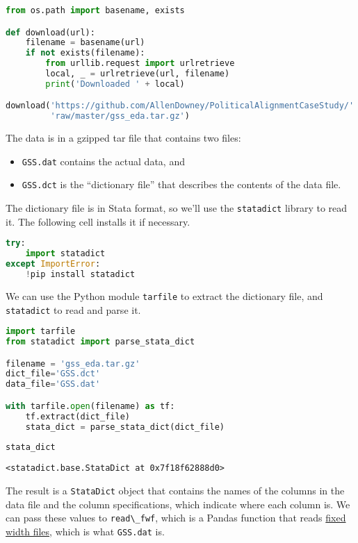 \begin{lstlisting}[language=Python]
from os.path import basename, exists

def download(url):
    filename = basename(url)
    if not exists(filename):
        from urllib.request import urlretrieve
        local, _ = urlretrieve(url, filename)
        print('Downloaded ' + local)

download('https://github.com/AllenDowney/PoliticalAlignmentCaseStudy/' +
         'raw/master/gss_eda.tar.gz')
\end{lstlisting}

The data is in a gzipped tar file that contains two files:

\begin{itemize}
\item
  \passthrough{\lstinline!GSS.dat!} contains the actual data, and
\item
  \passthrough{\lstinline!GSS.dct!} is the ``dictionary file'' that
  describes the contents of the data file.
\end{itemize}

The dictionary file is in Stata format, so we'll use the
\passthrough{\lstinline!statadict!} library to read it. The following
cell installs it if necessary.

\begin{lstlisting}[language=Python]
try:
    import statadict
except ImportError:
    !pip install statadict
\end{lstlisting}

We can use the Python module \passthrough{\lstinline!tarfile!} to
extract the dictionary file, and \passthrough{\lstinline!statadict!} to
read and parse it.

\begin{lstlisting}[language=Python]
import tarfile
from statadict import parse_stata_dict

filename = 'gss_eda.tar.gz'
dict_file='GSS.dct'
data_file='GSS.dat'

with tarfile.open(filename) as tf:
    tf.extract(dict_file)
    stata_dict = parse_stata_dict(dict_file)
        
stata_dict
\end{lstlisting}

\begin{lstlisting}[]
<statadict.base.StataDict at 0x7f18f62888d0>
\end{lstlisting}

The result is a \passthrough{\lstinline!StataDict!} object that contains
the names of the columns in the data file and the column specifications,
which indicate where each column is. We can pass these values to
\passthrough{\lstinline!read\_fwf!}, which is a Pandas function that
reads \href{https://en.wikipedia.org/wiki/Flat-file_database}{fixed
width files}, which is what \passthrough{\lstinline!GSS.dat!} is.

